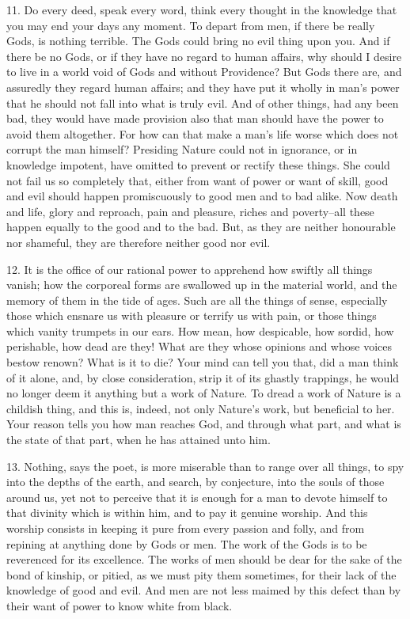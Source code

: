 \documentclass{book}
\begin{document}
11. Do every deed, speak every word, think every thought in the
knowledge that you may end your days any moment. To depart from men,
if there be really Gods, is nothing terrible. The Gods could bring no
evil thing upon you. And if there be no Gods, or if they have no
regard to human affairs, why should I desire to live in a world void
of Gods and without Providence? But Gods there are, and assuredly they
regard human affairs; and they have put it wholly in man's power that
he should not fall into what is truly evil. And of other things, had
any been bad, they would have made provision also that man should have
the power to avoid them altogether. For how can that make a man's life
worse which does not corrupt the man himself? Presiding Nature could
not in ignorance, or in knowledge impotent, have omitted to prevent or
rectify these things. She could not fail us so completely that, either
from want of power or want of skill, good and evil should happen
promiscuously to good men and to bad alike. Now death and life, glory
and reproach, pain and pleasure, riches and poverty--all these
happen equally to the good and to the bad. But, as they are neither
honourable nor shameful, they are therefore neither good nor evil.

12. It is the office of our rational power to apprehend how swiftly
all things vanish; how the corporeal forms are swallowed up in the
material world, and the memory of them in the tide of ages. Such are
all the things of sense, especially those which ensnare us with
pleasure or terrify us with pain, or those things which vanity
trumpets in our ears. How mean, how despicable, how sordid, how
perishable, how dead are they! What are they whose opinions and whose
voices bestow renown? What is it to die? Your mind can tell you that,
did a man think of it alone, and, by close consideration, strip it of
its ghastly trappings, he would no longer deem it anything but a work
of Nature. To dread a work of Nature is a childish thing, and this is,
indeed, not only Nature's work, but beneficial to her. Your reason
tells you how man reaches God, and through what part, and what is the
state of that part, when he has attained unto him.

13. Nothing, says the poet, is more miserable than to range over all
things, to spy into the depths of the earth, and search, by
conjecture, into the souls of those around us, yet not to perceive
that it is enough for a man to devote himself to that divinity which
is within him, and to pay it genuine worship. And this worship
consists in keeping it pure from every passion and folly, and from
repining at anything done by Gods or men. The work of the Gods is to
be reverenced for its excellence. The works of men should be dear for
the sake of the bond of kinship, or pitied, as we must pity them
sometimes, for their lack of the knowledge of good and evil. And men
are not less maimed by this defect than by their want of power to know
white from black.
\end{document}
